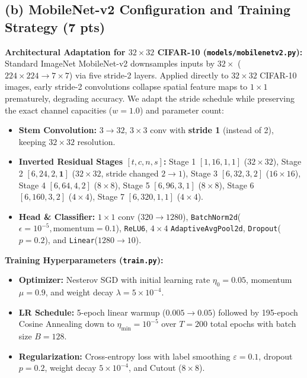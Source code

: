 \documentclass[11pt,a4paper]{article}
\begin{document}
\subsection*{(b) MobileNet-v2 Configuration and Training Strategy (7 pts)}
\textbf{Architectural Adaptation for $32\times 32$ CIFAR-10 (\texttt{models/mobilenetv2.py}):}
Standard ImageNet MobileNet-v2 downsamples inputs by $32\times$ ($224\times 224 \to 7\times 7$) via five stride-2 layers. Applied directly to $32\times 32$ CIFAR-10 images, early stride-2 convolutions collapse spatial feature maps to $1\times 1$ prematurely, degrading accuracy. We adapt the stride schedule while preserving the exact channel capacities ($w=1.0$) and parameter count:
\begin{itemize}\setlength\itemsep{2pt}
    \item \textbf{Stem Convolution:} $3\to 32$, $3\times 3$ conv with \textbf{stride 1} (instead of 2), keeping $32\times 32$ resolution.
    \item \textbf{Inverted Residual Stages $[t, c, n, s]$:} Stage 1 $[1, 16, 1, 1]$ ($32\times 32$), Stage 2 $[6, 24, 2, \mathbf{1}]$ ($32\times 32$, stride changed $2\to 1$), Stage 3 $[6, 32, 3, 2]$ ($16\times 16$), Stage 4 $[6, 64, 4, 2]$ ($8\times 8$), Stage 5 $[6, 96, 3, 1]$ ($8\times 8$), Stage 6 $[6, 160, 3, 2]$ ($4\times 4$), Stage 7 $[6, 320, 1, 1]$ ($4\times 4$).
    \item \textbf{Head \& Classifier:} $1\times 1$ conv ($320\to 1280$), \texttt{BatchNorm2d}($\epsilon=10^{-5}, \text{momentum}=0.1$), \texttt{ReLU6}, $4\times 4$ \texttt{AdaptiveAvgPool2d}, \texttt{Dropout}($p=0.2$), and \texttt{Linear}($1280\to 10$).
\end{itemize}

\noindent\textbf{Training Hyperparameters (\texttt{train.py}):}
\begin{itemize}\setlength\itemsep{2pt}
    \item \textbf{Optimizer:} Nesterov SGD with initial learning rate $\eta_0 = 0.05$, momentum $\mu = 0.9$, and weight decay $\lambda = 5\times 10^{-4}$.
    \item \textbf{LR Schedule:} 5-epoch linear warmup ($0.005 \to 0.05$) followed by 195-epoch Cosine Annealing down to $\eta_{\min} = 10^{-5}$ over $T = 200$ total epochs with batch size $B = 128$.
    \item \textbf{Regularization:} Cross-entropy loss with label smoothing $\varepsilon = 0.1$, dropout $p = 0.2$, weight decay $5\times 10^{-4}$, and Cutout ($8\times 8$).
\end{itemize}
\end{document}
